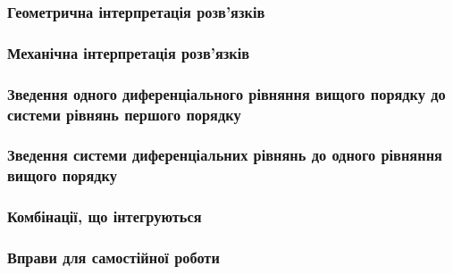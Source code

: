 \documentclass[a4paper, 12pt]{article}
\theoremstyle{definition}
\numberwithin{equation}{section}%
\numberwithin{equation}{subsection}
\begin{document}


\subsubsection{Геометрична інтерпретація розв'язків}



\subsubsection{Механічна інтерпретація розв'язків}



\subsubsection{Зведення одного диференціального рівняння вищого порядку до системи рівнянь першого порядку}



\subsubsection{Зведення системи диференціальних рівнянь до одного рівняння вищого порядку}



\subsubsection{Комбінації, що інтегруються}



\subsubsection{Вправи для самостійної роботи}



\newpage

\nocite{*}




\end{document}
